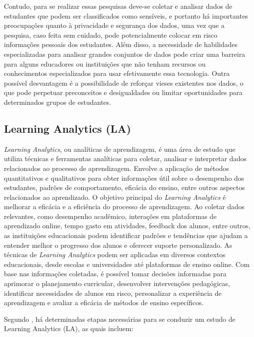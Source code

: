 Contudo, para se realizar essas pesquisas deve-se coletar e analisar dados de estudantes que podem ser classificados como sensíveis, e portanto há importantes preocupações quanto à privacidade e segurança dos dados, uma vez que a pesquisa, caso feita sem cuidado, pode potencialmente colocar em risco informações pessoais dos estudantes. Além disso, a necessidade de habilidades especializadas para analisar grandes conjuntos de dados pode criar uma barreira para alguns educadores ou instituições que não tenham recursos ou conhecimentos especializados para usar efetivamente essa tecnologia. Outra possível desvantagem é a possibilidade de reforçar vieses existentes nos dados, o que pode perpetuar preconceitos e desigualdades ou limitar oportunidades para determinados grupos de estudantes.



\subsection{Learning Analytics (LA)}

\textit{Learning Analytics}, ou {analíticas de aprendizagem}, é uma área de estudo que utiliza técnicas e ferramentas analíticas para coletar, analisar e interpretar dados relacionados ao processo de aprendizagem. Envolve a aplicação de métodos quantitativos e qualitativos para obter informações útil sobre o desempenho dos estudantes, padrões de comportamento, eficácia do ensino, entre outros aspectos relacionados ao aprendizado. O objetivo principal do \textit{Learning Analytics} é melhorar a eficácia e a eficiência do processo de aprendizagem. Ao coletar dados relevantes, como desempenho acadêmico, interações em plataformas de aprendizado online, tempo gasto em atividades, feedback dos alunos, entre outros, as instituições educacionais podem identificar padrões e tendências que ajudam a entender melhor o progresso dos alunos e oferecer suporte personalizado. As técnicas de \textit{Learning Analytics} podem ser aplicadas em diversos contextos educacionais, desde escolas e universidades até plataformas de ensino online. Com base nas informações coletadas, é possível tomar decisões informadas para aprimorar o planejamento curricular, desenvolver intervenções pedagógicas, identificar necessidades de alunos em risco, personalizar a experiência de aprendizagem e avaliar a eficácia de métodos de ensino específicos.

{Segundo , há determinadas etapas necessárias para se conduzir um estudo de Learning Analytics (LA), as quais incluem:}

